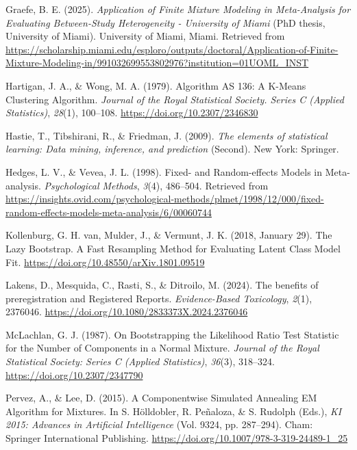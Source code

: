 \documentclass[
  english,
  man, noextraspace,floatsintext]{apa6}
\newlength{\cslhangindent}
\newenvironment{CSLReferences}[2] %
 {\begin{list}{}{%
  \setlength{\itemindent}{0pt}
  \setlength{\leftmargin}{0pt}
  \setlength{\parsep}{0pt}
  \ifodd #1
   \setlength{\leftmargin}{\cslhangindent}
   \setlength{\itemindent}{-1\cslhangindent}
  \fi
  \setlength{\itemsep}{#2\baselineskip}}}
 {\end{list}}
\begin{document}
\begin{CSLReferences}{1}{0}
Graefe, B. E. (2025). \emph{Application of {Finite Mixture Modeling} in {Meta-Analysis} for {Evaluating Between-Study Heterogeneity} - {University} of {Miami}} (PhD thesis, University of Miami). University of Miami, Miami. Retrieved from \url{https://scholarship.miami.edu/esploro/outputs/doctoral/Application-of-Finite-Mixture-Modeling-in/991032699553802976?institution=01UOML_INST}

Hartigan, J. A., \& Wong, M. A. (1979). Algorithm {AS} 136: {A K-Means Clustering Algorithm}. \emph{Journal of the Royal Statistical Society. Series C (Applied Statistics)}, \emph{28}(1), 100--108. \url{https://doi.org/10.2307/2346830}

Hastie, T., Tibshirani, R., \& Friedman, J. (2009). \emph{The elements of statistical learning: {Data} mining, inference, and prediction} (Second). New York: Springer.

Hedges, L. V., \& Vevea, J. L. (1998). Fixed- and {Random}-effects {Models} in {Meta}-analysis. \emph{Psychological Methods}, \emph{3}(4), 486--504. Retrieved from \url{https://insights.ovid.com/psychological-methods/plmet/1998/12/000/fixed-random-effects-models-meta-analysis/6/00060744}

Kollenburg, G. H. van, Mulder, J., \& Vermunt, J. K. (2018, January 29). The {Lazy Bootstrap}. {A Fast Resampling Method} for {Evaluating Latent Class Model Fit}. \url{https://doi.org/10.48550/arXiv.1801.09519}

Lakens, D., Mesquida, C., Rasti, S., \& Ditroilo, M. (2024). The benefits of preregistration and {Registered Reports}. \emph{Evidence-Based Toxicology}, \emph{2}(1), 2376046. \url{https://doi.org/10.1080/2833373X.2024.2376046}

McLachlan, G. J. (1987). On {Bootstrapping} the {Likelihood Ratio Test Statistic} for the {Number} of {Components} in a {Normal Mixture}. \emph{Journal of the Royal Statistical Society: Series C (Applied Statistics)}, \emph{36}(3), 318--324. \url{https://doi.org/10.2307/2347790}

Pervez, A., \& Lee, D. (2015). A {Componentwise Simulated Annealing EM Algorithm} for {Mixtures}. In S. Hölldobler, R. Peñaloza, \& S. Rudolph (Eds.), \emph{{KI} 2015: {Advances} in {Artificial Intelligence}} (Vol. 9324, pp. 287--294). Cham: Springer International Publishing. \url{https://doi.org/10.1007/978-3-319-24489-1_25}


\end{CSLReferences}
\end{document}
